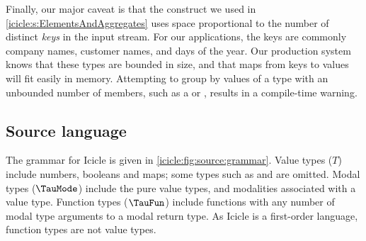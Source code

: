 Finally, our major caveat is that the \Ic@group@ construct we used in \cref{icicle:s:ElementsAndAggregates} uses space proportional to the number of distinct \emph{keys} in the input stream.
For our applications, the keys are commonly company names, customer names, and days of the year.
Our production system knows that these types are bounded in size, and that maps from keys to values will fit easily in memory.
Attempting to group by values of a type with an unbounded number of members, such as a \Ic@Real@ or \Ic@String@, results in a compile-time warning.




\subsection{Source language}
\label{icicle:s:IcicleSource}

The grammar for Icicle is given in \cref{icicle:fig:source:grammar}.
Value types ($T$) include numbers, booleans and maps; some types such as \Ic@Real@ and \Ic@String@ are omitted.
Modal types ($\TauMode$) include the pure value types, and modalities associated with a value type.
Function types ($\TauFun$) include functions with any number of modal type arguments to a modal return type.
As Icicle is a first-order language, function types are not value types.


